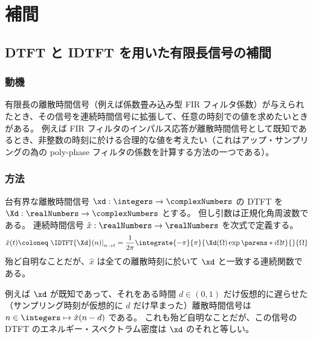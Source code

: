 \chapter{補間}
    \section{DTFT と IDTFT を用いた有限長信号の補間}
        \subsection{動機}
            有限長の離散時間信号（例えば係数畳み込み型 FIR フィルタ係数）が与えられたとき、その信号を連続時間信号に拡張して、任意の時刻での値を求めたいときがある。
            例えば FIR フィルタのインパルス応答が離散時間信号として既知であるとき、非整数の時刻に於ける合理的な値を考えたい（これはアップ・サンプリングの為の poly-phase フィルタの係数を計算する方法の一つである）。
        \subsection{方法}
            台有界な離散時間信号 $\xd:\integers\to\complexNumbers$ の DTFT を $\Xd:\realNumbers\to\complexNumbers$ とする。
            但し引数は正規化角周波数である。
            連続時間信号 $\hat{x}:\realNumbers\to\realNumbers$ を次式で定義する。
            \[ \hat{x}(t)\coloneq\left.\IDTFT{\Xd}(n)\right|_{n\to t} = \frac{1}{2\pi}\integrate{-\pi}{\pi}{\Xd(\Omega)\exp\parens*{i\Omega t}}{}{\Omega} \]
            殆ど自明なことだが、$\hat{x}$ は全ての離散時刻に於いて $\xd$ と一致する連続関数である。
            \par
            例えば $\xd$ が既知であって、それをある時間 $d\in(0,1)$ だけ仮想的に遅らせた（サンプリング時刻が仮想的に $d$ だけ早まった）離散時間信号は $n\in\integers\mapsto\hat{x}(n-d)$ である。
            これも殆ど自明なことだが、この信号の DTFT のエネルギー・スペクトラム密度は $\xd$ のそれと等しい。
